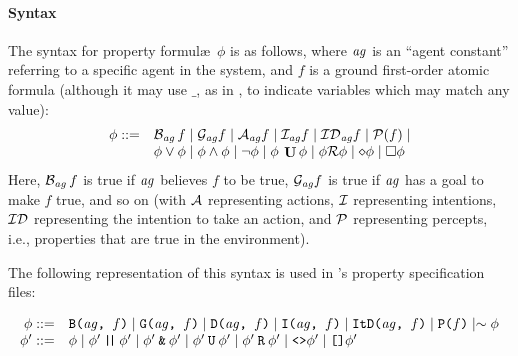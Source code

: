 \paragraph{Syntax}
The syntax for property formul\ae\ $\phi$ is as follows, where
$\mathit{ag}$ is an ``agent constant'' referring to a specific agent in
the system, and $f$ is a ground first-order atomic formula (although it may use $\_$, as in \prolog, to indicate variables which may match any value):
%
\begin{equation*}
\begin{array}{rl}
\phi ::= & \mathrm{{\cal B}}_{\mathit{ag}} \, f \mid \mathrm{{\cal G}}_{\mathit{ag}} f \mid
  \mathrm{{\cal A}}_{\mathit{ag}} f \mid \mathrm{{\cal I}}_{\mathit{ag}} f \mid
  \mathrm{{\cal ID}}_{\mathit{ag}} f \mid
  \mathrm{{\cal P}}(f) \mid \\ &
  \phi \vee \phi \mid \phi \wedge \phi \mid \neg \phi
   \mid \phi \: \mathop{\mathrm{\mathbf{U}}} \phi \mid \phi \mathcal{R} \phi \mid \diamond \phi \mid \Box \phi
\end{array}
\end{equation*}
%
Here, $\mathrm{{\cal B}}_{\mathit{ag}} \, f$\index{$\lbeliefop$} is true if $\mathit{ag}$ believes
$f$ to be true, $\mathrm{{\cal G}}_{\mathit{ag}} f$\index{$\lgoalop$} is true if $\mathit{ag}$ has a
goal to make $f$ true, and so on (with $\lactionsfunc$\index{$\lactionsfunc$} representing
actions, $\lintentionfunc$\index{$\lintentionfunc$} representing intentions, $\lintendtodofunc$\index{$\lintendtodofunc$} representing the intention to take an action, and $\lperceptfunc$\index{$\lperceptfunc$}
representing percepts, i.e., properties that are true in the environment).

The following representation of this syntax is used in \ajpf's property specification files:

\begin{equation*}
\begin{array}{rl}
\phi ::= & \texttt{B(}\mathit{ag}\texttt{, }f\texttt{)} \mid 
\texttt{G(}\mathit{ag}\texttt{, }f\texttt{)} \mid 
\texttt{D(}\mathit{ag}\texttt{, }f\texttt{)} \mid 
\texttt{I(}\mathit{ag}\texttt{, }f\texttt{)} \mid 
\texttt{ItD(}\mathit{ag}\texttt{, }f\texttt{)} \mid 
\texttt{P(}f\texttt{)} \mid \sim \phi \\
\phi' ::= & \phi \mid 
  \phi' \: \texttt{|\!|} \: \phi' \mid 
  \phi' \: \texttt{\&} \: \phi' \mid 
   \phi' \: \texttt{U} \: \phi' \mid \phi' \: \texttt{R} \: \phi' \mid \texttt{<>} \phi' \mid \texttt{[]} \phi'
\end{array}
\end{equation*}

